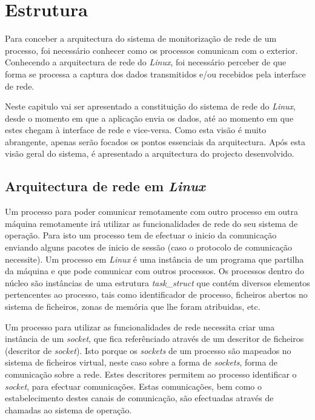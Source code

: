 \chapter{Estrutura}
\label{cap:Estrutura}

Para conceber a arquitectura do sistema de monitorização de rede de um processo, foi necessário conhecer como os processos comunicam com o exterior.
 Conhecendo a arquitectura de rede do \textit{Linux}, foi necessário perceber de que forma se processa a captura dos dados transmitidos e/ou recebidos pela interface de rede. 

Neste capitulo vai ser apresentado a constituição do sistema de rede do \textit{Linux}, desde o momento em que a aplicação envia os dados, até ao momento em que estes chegam à interface de rede e vice-versa.
Como esta visão é muito abrangente, apenas serão focados os pontos essenciais da arquitectura.
Após esta visão geral do sistema, é apresentado a arquitectura do projecto desenvolvido.


\section{Arquitectura de rede em \textit{Linux}}
\label{sub:network}
 Um processo para poder comunicar remotamente com outro processo em outra máquina remotamente irá utilizar as funcionalidades de rede do seu sistema de operação.
 Para isto um processo tem de efectuar o inicio da comunicação enviando alguns pacotes de inicio de sessão (caso o protocolo de comunicação necessite).
 Um processo em \textit{Linux} é uma instância de um programa que partilha da máquina e que pode comunicar com outros processos.
 Os processos dentro do núcleo são instâncias de uma estrutura \textit{task\_struct} que contém diversos elementos pertencentes ao processo, tais como identificador de processo, ficheiros abertos no sistema de ficheiros, zonas de memória que lhe foram atribuidas, etc.
 
 Um processo para utilizar as funcionalidades de rede necessita criar uma instância de um \textit{socket}, que fica referênciado através de um descritor de ficheiros (descritor de \textit{socket}).
 Isto porque os \textit{sockets} de um processo são mapeados no sistema de ficheiros virtual, neste caso sobre a forma de \textit{sockets}, forma de comunicação sobre a rede.
 Estes descritores permitem ao processo identificar o \textit{socket}, para efectuar comunicações.
 Estas comunicações, bem como o estabelecimento destes canais de comunicação, são efectuadas através de chamadas ao sistema de operação.


